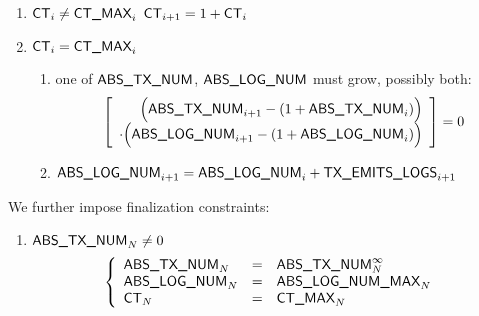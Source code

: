 \begin{enumerate}
\begin{enumerate}
			\item \If $\textsf{CT}_{i} \neq \textsf{CT\_MAX}_{i}$ \Then $\textsf{CT}_{i + 1} = 1 + \textsf{CT}_{i}$
			\item \If $\textsf{CT}_{i} =    \textsf{CT\_MAX}_{i}$ \Then
				\begin{enumerate}
					\item one of $\textsf{ABS\_TX\_NUM}$, $\textsf{ABS\_LOG\_NUM}$ must grow, possibly both:
						\[
							\left[ \begin{array}{r}
								\Big( \textsf{ABS\_TX\_NUM}_{i + 1}  - (1 + \textsf{ABS\_TX\_NUM}_{i} ) \Big)   \\
								\cdot
								\Big( \textsf{ABS\_LOG\_NUM}_{i + 1} - (1 + \textsf{ABS\_LOG\_NUM}_{i}) \Big) \\
							\end{array} \right]
							= 0
						\]
					\item $\textsf{ABS\_LOG\_NUM}_{i + 1} = \textsf{ABS\_LOG\_NUM}_{i} + \textsf{TX\_EMITS\_LOGS}_{i + 1}$
				\end{enumerate}
		\end{enumerate}
\end{enumerate}
We further impose finalization constraints:
\begin{enumerate}[resume]
	\item  \If $\textsf{ABS\_TX\_NUM}_{N} \neq 0$ \Then 
		\[
			\left\{ \begin{array}{lcl}
				\textsf{ABS\_TX\_NUM}_{N}          & = & \textsf{ABS\_TX\_NUM}^\infty_{N}      \\
				\textsf{ABS\_LOG\_NUM}_{N}            & = & \textsf{ABS\_LOG\_NUM\_MAX}_{N}     \\
				\textsf{CT}_{N}                & = & \textsf{CT\_MAX}_{N}         \\
			\end{array} \right.
		\]
\end{enumerate}
